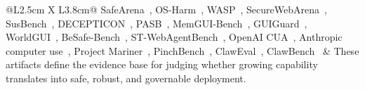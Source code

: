 \begin{table}[!ht]
\begin{tabularx}{\textwidth}{@{}L{2.5cm} X L{3.8cm}@{}}
\colorbox{evSaf!15}{SafeArena~\cite{safearena2025}},
\colorbox{evSaf!15}{OS-Harm~\cite{osharm2025}},
\colorbox{evSaf!15}{WASP~\cite{wasp2025}},
\colorbox{evSaf!15}{SecureWebArena~\cite{securewebarena2025}},
\colorbox{evSaf!15}{SusBench~\cite{susbench2025}},
\colorbox{evSaf!15}{DECEPTICON~\cite{decepticon2025}},
\colorbox{evSaf!15}{PASB~\cite{doubleagent2026}},
\colorbox{evSaf!15}{MemGUI-Bench~\cite{memguibench2026}},
\colorbox{evSaf!15}{GUIGuard~\cite{guiguard2026}},
\colorbox{evSaf!15}{WorldGUI~\cite{worldgui2025}},
\colorbox{evSaf!15}{BeSafe-Bench~\cite{besafebench2026}},
\colorbox{evSaf!15}{ST-WebAgentBench~\cite{stwebagentbench2025}},
OpenAI CUA~\cite{openai2025cua},
Anthropic computer use~\cite{anthropic2025computeruse},
Project Mariner~\cite{google2026mariner},
PinchBench~\cite{pinchbench2026},
ClawEval~\cite{claweval2026},
ClawBench~\cite{clawbench2026} &
These artifacts define the evidence base for judging whether growing capability translates into safe, robust, and governable deployment. \\
\bottomrule
\end{tabularx}
\end{table}



